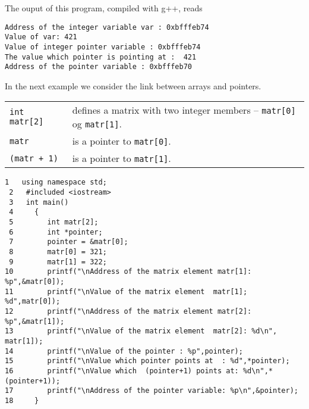 %
The ouput of this program, compiled with g++, reads
\begin{tcolorbox}
\begin{verbatim}
Address of the integer variable var : 0xbfffeb74
Value of var: 421
Value of integer pointer variable : 0xbfffeb74
The value which pointer is pointing at :  421
Address of the pointer variable : 0xbfffeb70
\end{verbatim}
\end{tcolorbox}
In the next example we consider the link between arrays and pointers.
\begin{center}
\begin{tabular}{ll}
\begin{minipage}[t]{0.2\textwidth}
\tt int matr[2]
\vspace*{2mm}
\end{minipage}
&
\begin{minipage}[t]{0.7\textwidth}
defines a matrix with two integer members
-- {\tt matr[0]} og {\tt matr[1]}.
\end{minipage}\\[1ex]
\begin{minipage}[t]{0.2\textwidth}
\tt matr
\end{minipage}
&
\begin{minipage}[t]{0.7\textwidth}
is a pointer to {\tt matr[0]}.
\end{minipage}\\[1ex]
%
\begin{minipage}[t]{0.2\textwidth}
\tt (matr + 1)
\end{minipage}
&
\begin{minipage}[t]{0.7\textwidth}
is a pointer to {\tt matr[1]}.
\end{minipage}\\
\end{tabular}
\end{center}
\begin{lstlisting}[title={\url{http://folk.uio.no/mhjensen/compphys/programs/chapter02/cpp/program8.cpp}}]
 1   using namespace std;
 2   #included <iostream>
 3   int main()  
 4     {   
 5        int matr[2];  
 6        int *pointer;  
 7        pointer = &matr[0];  
 8        matr[0] = 321;  
 9        matr[1] = 322;  
10        printf("\nAddress of the matrix element matr[1]: %p",&matr[0]);
11        printf("\nValue of the matrix element  matr[1]; %d",matr[0]);
12        printf("\nAddress of the matrix element matr[2]: %p",&matr[1]);
13        printf("\nValue of the matrix element  matr[2]: %d\n", matr[1]);
14        printf("\nValue of the pointer : %p",pointer);
15        printf("\nValue which pointer points at  : %d",*pointer);
16        printf("\nValue which  (pointer+1) points at: %d\n",*(pointer+1));
17        printf("\nAddress of the pointer variable: %p\n",&pointer);
18     }
\end{lstlisting}
